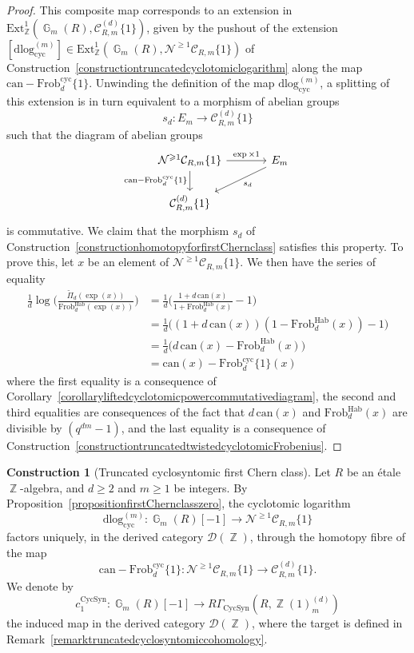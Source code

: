 \documentclass[10pt,twoside]{scrarticle}
\newlength{\mar} \setlength{\mar}{1cm}%
\newlength{\len}
\theoremstyle{definition}
\newtheorem{construction}[theorem]{Construction}
\DeclareMathOperator{\Z}{\mathbb{Z}}
\DeclareMathOperator{\G}{\mathbb{G}}
\newcommand{\can}{\text{can}}
\newcommand{\CRm}{\mathcal{C}_{R,m}}
\newcommand{\Frob}{\mathrm{Frob}}
\newcommand{\Cyc}{\mathrm{cyc}}
\newcommand{\Hab}{\mathrm{Hab}}
\newcommand{\CycSyn}{\mathrm{CycSyn}}
\renewcommand{\ge}{\geqslant}
\newcommand{\dlog}{\mathrm{dlog}}
\numberwithin{equation}{theorem}
\begin{document}
\begin{proof}
    This composite map corresponds to an extension in $\text{Ext}^1_{\Z}(\G_m(R),\CRm^{(d)}\{1\})$, given by the pushout of the extension $[\dlog_{\Cyc}^{(m)}]\in  \text{Ext}^1_{\Z}(\G_m(R),\mathcal{N}^{\ge 1} \mathcal{C}_{R,m}\{1\})$ of Construction~\ref{constructiontruncatedcyclotomiclogarithm} along the map $\text{can} - \Frob_d^{\Cyc}\{1\}$. 
    Unwinding the definition of the map $\dlog_{\Cyc}^{(m)}$, a splitting of this extension is in turn equivalent to a morphism of abelian groups
    $$s_d : E_m \longrightarrow \CRm^{(d)}\{1\}$$
    such that the diagram of abelian groups
    $$\begin{tikzcd}[column sep = large]
        \mathcal{N}^{\ge 1} \CRm\{1\} \ar[d,"\can - \Frob_d^{\Cyc}\{1\}"'] \ar[r,"\exp \times 1"] & E_m \ar[ld,"s_d"] \\
        \CRm^{(d)}\{1\} &
    \end{tikzcd}$$
    is commutative.  
    We claim that the morphism $s_d$ of Construction~\ref{constructionhomotopyforfirstChernclass} satisfies this property. To prove this, let $x$ be an element of $\mathcal{N}^{\ge 1}\CRm\{1\}$. We then have the series of equality
    \begin{align*}
    \frac{1}{d}\log\Big(\frac{\tilde{\Pi}_d(\exp(x))}{\Frob_d^{\Hab}(\exp(x))}\Big) &= \frac{1}{d} \Big(\frac{1+d\,\can(x)}{1+\Frob_d^{\Hab}(x)} - 1\Big) \\
    &= \frac{1}{d} \big((1+d\,\can(x))(1-\Frob_d^{\Hab}(x)) - 1 \big) \\
    &= \frac{1}{d}\big(d\,\can(x) - \Frob_d^{\Hab}(x)\big) \\
    &= \can(x) - \Frob_d^{\Cyc}\{1\}(x)
    \end{align*}
    where the first equality is a consequence of Corollary~\ref{corollaryliftedcyclotomicpowercommutativediagram}, the second and third equalities are consequences of the fact that $d\,\can(x)$ and $\Frob_d^{\Hab}(x)$ are divisible by $(q^{dm}-1)$, and the last equality is a consequence of Construction~\ref{constructiontruncatedtwistedcyclotomicFrobenius}. 
\end{proof}

\begin{construction}[Truncated cyclosyntomic first Chern class]\label{constructiontruncatedcyclosyntomicfirstChernclass}
    Let $R$ be an étale $\Z$-algebra, and $d \ge 2$ and $m \ge 1$ be integers. By Proposition~\ref{propositionfirstChernclasszero}, the cyclotomic logarithm 
    $$\dlog^{(m)}_{\Cyc} : \G_m(R)[-1] \longrightarrow \mathcal{N}^{\ge 1} \mathcal{C}_{R,m}\{1\}$$
    factors uniquely, in the derived category $\mathcal{D}(\Z)$, through the homotopy fibre of the map
    $$\can - \Frob_d^{\Cyc}\{1\} : \mathcal{N}^{\ge 1} \mathcal{C}_{R,m}\{1\} \longrightarrow \CRm^{(d)}\{1\}.$$
    We denote by
    $$c_1^{\CycSyn} : \G_m(R)[-1] \longrightarrow R\Gamma_{\CycSyn}(R,\Z(1)^{(d)}_m)$$
    the induced map in the derived category $\mathcal{D}(\Z)$, where the target is defined in Remark~\ref{remarktruncatedcyclosyntomiccohomology}.
\end{construction}
\end{document}
